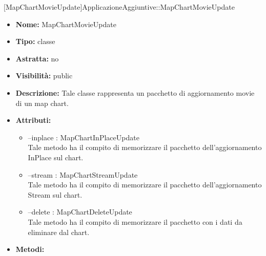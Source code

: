 			[MapChartMovieUpdate]{ApplicazioneAggiuntive::MapChartMovieUpdate}
			

	
			
			\begin{itemize}
			\item \textbf{Nome:} MapChartMovieUpdate
			\item \textbf{Tipo:} classe
			
		\item \textbf{Astratta:}
		no
			\item \textbf{Visibilità:} public
			\item \textbf{Descrizione:} Tale classe rappresenta un pacchetto di aggiornamento movie di un map chart.
			\item \textbf{Attributi:}
				\begin{itemize}
				\setlength{\itemsep}{5pt}
				
					\item[\ding{111}] {--inplace : MapChartInPlaceUpdate} \\ [1mm] Tale metodo ha il compito di memorizzare il pacchetto dell'aggiornamento InPlace sul chart.
					\item[\ding{111}] {--stream : MapChartStreamUpdate} \\ [1mm] Tale metodo ha il compito di memorizzare il pacchetto dell'aggiornamento Stream sul chart.
					\item[\ding{111}] {--delete : MapChartDeleteUpdate} \\ [1mm] Tale metodo ha il compito di memorizzare il pacchetto con i dati da eliminare dal chart.
				\end{itemize}
		
			\item \textbf{Metodi:}
				\begin{itemize}
				\setlength{\itemsep}{5pt}
				

\end{itemize}
\end{itemize}
